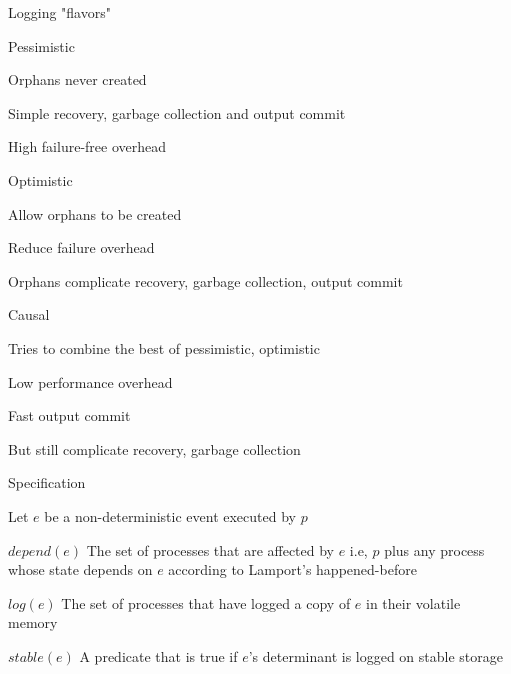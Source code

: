 \begin{frame}[shrink=5]{Logging "flavors"}
	
\begin{block}{Pessimistic}
\BI
\item Orphans never created
\item Simple recovery, garbage collection and output commit
\item High failure-free overhead
\EI
\end{block}
\begin{block}{Optimistic}
\BI
\item Allow orphans to be created
\item Reduce failure overhead
\item Orphans complicate recovery, garbage collection, output commit
\EI
\end{block}
\begin{block}{Causal}
\BI
\item Tries to combine the best of pessimistic, optimistic
	\BI 
	\item Low performance overhead
	\item Fast output commit
	\EI
\item But still complicate recovery, garbage collection
\EI
\end{block}
\end{frame}
\begin{frame}{Specification}
	
Let $e$ be a non-deterministic event executed by $p$

\medskip
\begin{block}{$\mathit{depend}(e)$}
The set of processes that are affected by $e$ i.e, $p$ plus any process whose state depends on $e$ according to Lamport's happened-before
\end{block}
\begin{block}{$\mathit{log}(e)$}
The set of processes that have logged a copy of $e$ in their volatile memory
\end{block}
\begin{block}{$\mathit{stable}(e)$}
A predicate that is true if $e$'s determinant is logged on stable storage
\end{block}
\end{frame}
